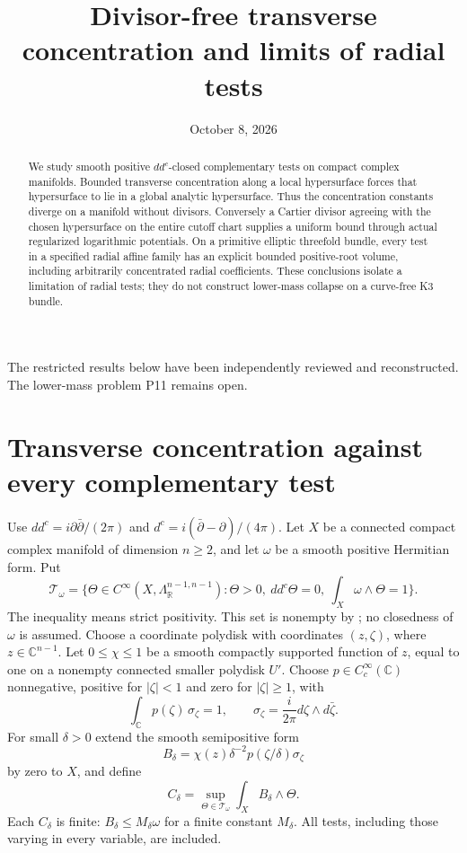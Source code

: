 \documentclass[11pt]{article}
\title{Divisor-free transverse concentration and limits of radial tests}
\author{}\date{October 8, 2026}
\theoremstyle{remark}\newtheorem{remark}{Remark}
\newcommand{\ddc}{dd^c}
\newcommand{\dc}{d^c}
\begin{document}
\maketitle
\noindent The restricted results below have been independently reviewed
and reconstructed. The lower-mass problem P11 remains open.
\begin{abstract}
We study smooth positive $\ddc$-closed complementary tests on compact
complex manifolds. Bounded transverse concentration along a local
hypersurface forces that hypersurface to lie in a global analytic
hypersurface. Thus the concentration constants diverge on a manifold
without divisors. Conversely a Cartier divisor agreeing with the chosen
hypersurface on the entire cutoff chart supplies a uniform bound through
actual regularized logarithmic potentials. On a primitive elliptic
threefold bundle, every test in a specified radial affine family has an
explicit bounded positive-root volume, including arbitrarily concentrated
radial coefficients. These conclusions isolate a limitation of radial
tests; they do not construct lower-mass collapse on a curve-free K3 bundle.
\end{abstract}

\section{Transverse concentration against every complementary test}
Use $\ddc=i\partial\bar\partial/(2\pi)$ and
$\dc=i(\bar\partial-\partial)/(4\pi)$. Let $X$ be a connected compact
complex manifold of dimension $n\geq2$, and let $\omega$ be a smooth
positive Hermitian form. Put
\[
 \mathcal T_\omega=\{\Theta\in C^\infty(X,\Lambda^{n-1,n-1}_{\mathbb R}):
 \Theta>0,\ \ddc\Theta=0,\ \int_X\omega\wedge\Theta=1\}.
\]
The inequality means strict positivity. This set is nonempty by
\cite[Proposition 1.3]{Lamari}; no closedness of $\omega$ is assumed.
Choose a coordinate polydisk with coordinates $(z,\zeta)$, where
$z\in\mathbb C^{n-1}$. Let $0\leq\chi\leq1$ be a smooth compactly
supported function of $z$, equal to one on a nonempty connected smaller
polydisk $U'$. Choose $p\in C_c^\infty(\mathbb C)$ nonnegative, positive for
$|\zeta|<1$ and zero for $|\zeta|\geq1$, with
\[
 \int_{\mathbb C}p(\zeta)\,\sigma_\zeta=1,\qquad
 \sigma_\zeta=\frac{i}{2\pi}d\zeta\wedge d\bar\zeta.
\]
For small $\delta>0$ extend the smooth semipositive form
\[
 B_\delta=\chi(z)\delta^{-2}p(\zeta/\delta)\sigma_\zeta
\]
by zero to $X$, and define
\[
 C_\delta=\sup_{\Theta\in\mathcal T_\omega}
                    \int_X B_\delta\wedge\Theta.
\]
Each $C_\delta$ is finite: $B_\delta\leq M_\delta\omega$ for a finite
constant $M_\delta$. All tests, including those varying in every variable,
are included.
\end{document}
